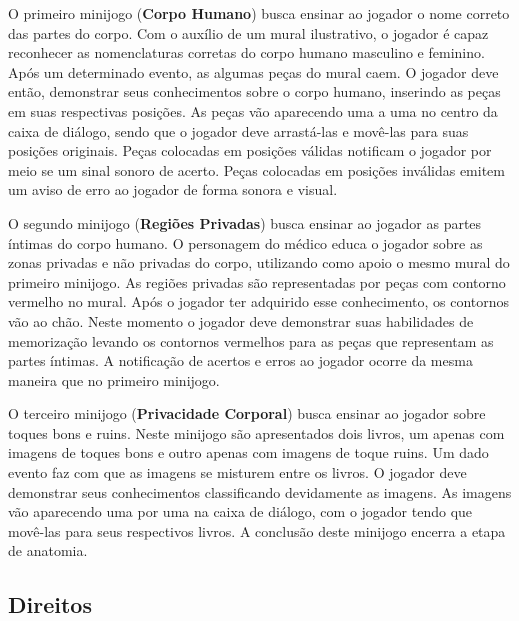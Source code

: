 O primeiro minijogo (\textbf{Corpo Humano}) busca ensinar ao jogador o nome correto das partes do corpo. Com o auxílio de um mural ilustrativo, o jogador é capaz reconhecer as nomenclaturas corretas do corpo humano masculino e feminino. Após um determinado evento, as  algumas peças do mural caem. O jogador deve então, demonstrar seus conhecimentos sobre o corpo humano, inserindo as peças em suas respectivas posições. As peças vão aparecendo uma a uma no centro da caixa de diálogo, sendo que o jogador deve arrastá-las e movê-las para suas posições originais. Peças colocadas em posições válidas notificam o jogador por meio se um sinal sonoro de acerto. Peças colocadas em posições inválidas emitem um aviso de erro ao jogador de forma sonora e visual. 

O segundo minijogo (\textbf{Regiões Privadas}) busca ensinar ao jogador as partes íntimas do corpo humano. O personagem do médico educa o jogador sobre as zonas privadas e não privadas do corpo, utilizando como apoio o mesmo mural do primeiro minijogo. As regiões privadas são representadas por peças com contorno vermelho no mural. Após o jogador ter adquirido esse conhecimento, os contornos vão ao chão. Neste momento o jogador deve demonstrar suas habilidades de memorização levando os contornos vermelhos para as peças que representam as partes íntimas. A notificação de acertos e erros ao jogador ocorre da mesma maneira que no primeiro minijogo. %

O terceiro minijogo (\textbf{Privacidade Corporal}) busca ensinar ao jogador sobre toques bons e ruins. Neste minijogo são apresentados dois livros, um apenas com imagens de toques bons e outro apenas com imagens de toque ruins. Um dado evento faz com que as imagens se misturem entre os livros. O jogador deve demonstrar seus conhecimentos classificando devidamente as imagens. As imagens vão aparecendo uma por uma na caixa de diálogo, com o jogador tendo que movê-las para seus respectivos livros. A conclusão deste minijogo encerra a etapa de anatomia. %


\subsection{Direitos}\label{subsec:2}

